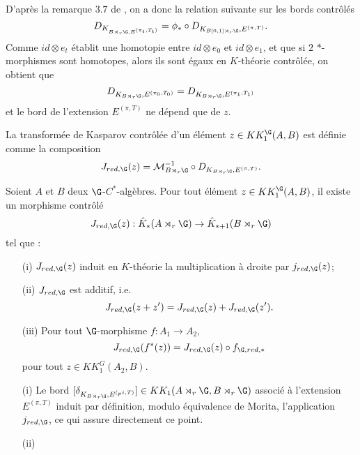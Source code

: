 D'après la remarque $3.7$ de \cite{OY2}, on a donc la relation suivante sur les bords contrôlés
\[D_{K_{B\rtimes_r\G,E^{(\pi_t,T_t)}}} = \phi_* \circ D_{K_{B[0,1]\rtimes_r\G},E^{(\pi,T)}}.\]
Comme $id \otimes e_t$ établit une homotopie entre $id\otimes e_0$ et $id\otimes e_1$, et que si $2$ $*$-morphismes sont homotopes, alors ils sont égaux en $K$-théorie contrôlée, on obtient que 
\[D_{K_{B\rtimes_r \G}, E^{(\pi_0,T_0)}}=D_{K_{B\rtimes_r \G}, E^{(\pi_1,T_1)}}\]
et le bord de l'extension $E^{(\pi,T)}$ ne dépend que de $z$.\\

\begin{definition}
La transformée de Kasparov contrôlée d'un élément $z\in KK_1^\G(A,B)$ est définie comme la composition
\[J_{red,\G}(z)=\mathcal M_{B\rtimes_r \G}^{-1}\circ D_{K_{B\rtimes_r \G}, E^{(\pi,T)}}.\]
\end{definition}

\begin{prop}
Soient $A$ et $B$ deux $\G$-$C^*$-algèbres. Pour tout élément $z\in KK^\G_1(A,B)$, il existe un morphisme contrôlé
\[J_{red,\G}(z) : \hat K_*(A\rtimes_r \G)\rightarrow \hat K_{*+1}(B\rtimes_r \G)\]
tel que :
\begin{enumerate}
\item[(i)] $J_{red,\G}(z)$ induit en $K$-théorie la multiplication à droite par $j_{red,\G}(z)$;
\item[(ii)] $J_{red,\G}$ est additif, i.e.
\[J_{red,\G}(z+z')=J_{red,\G}(z)+J_{red,\G}(z').\]
\item[(iii)] Pour tout $\G$-morphisme $f : A_1\rightarrow A_2$,
\[J_{red,\G}(f^*(z))=J_{red,\G}(z)\circ f_{\G,red,*}\] pour tout $z\in KK_1^G(A_2,B)$.
\end{enumerate}
\end{prop}

\begin{dem}
\begin{enumerate}
\item[(i)] Le bord $[\delta_{K_{B\rtimes_r \G},E^{(_pi,T)}}]\in KK_1(A\rtimes_r \G, B\rtimes_r \G)$ associé à l'extension $E^{(\pi,T)}$ induit par définition, modulo équivalence de Morita, l'application $j_{red,\G}$, ce qui assure directement ce point.
\item[(ii)] 
\end{enumerate}
\end{dem}


